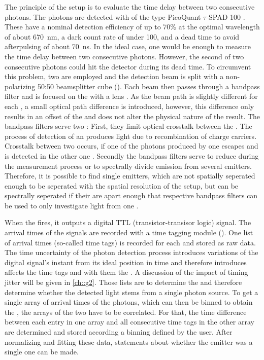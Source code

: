 		The principle of the \hbt setup is to evaluate the time delay between two consecutive photons. 
		The photons are detected with \apds of the type PicoQuant $\tau${}-SPAD 100 .
		These \apds have a nominal detection efficiency of up to 70\% at the optimal wavelength of about \SI{670}{\nm}, a dark count rate of under \SI{100}{\cps}, and a dead time to avoid afterpulsing of about \SI{70}{\ns}.
		In the ideal case, one \APD would be enough to measure the time delay between two consecutive photons. 
		However, the second of two consecutive photons could hit the detector during its dead time.
		To circumvent this problem, two \APDs are employed and the detection beam is split with a non-polarizing 50:50 beamsplitter cube ().
		Each beam then passes through a bandpass filter and is focused on the \apd with a lens .
		As the beam path is slightly different for each \APD, a small optical path difference is introduced, however, this difference only results in an offset of the \gtf and does not alter the physical nature of the result.
		The bandpass filters serve two :
		First, they limit optical crosstalk between the \apds. 
		The process of detection of an \apd produces light due to recombination of charge carriers. 
		Crosstalk between two \apds occurs, if one of the photons produced by one \apd escapes and is detected in the other one \cite{Younger2009}.  
		Secondly the bandpass filters serve to reduce \bkg during the \gt measurement process or to spectrally divide emission from several emitters.
		Therefore, it is possible to find single emitters, which are not spatially seperated enough to be seperated with the spatial resolution of the setup, but can be spectrally seperated if their \ZPLs are apart enough that respective bandpass filters can be used to only investigate light from one \ZPL.

		When the \APD fires, it outputs a digital TTL (transistor-transisor logic) signal. 
		The arrival times of the signals are recorded with a time tagging module ().
		One list of arrival times (so-called time tags) is recorded for each \APD and stored as raw data.
		The time uncertainty of the photon detection process introduces variations of the digital signal's instant from its ideal position in time and therefore introduces affects the time tags and with them the \gtf.
		A discussion of the impact of timing jitter will be given in \autoref{ch::g2}. 
		Those lists are to determine the \gtf and therefore determine whether the detected light stems from a single photon source.
		To get a single array of arrival times of the photons, which can then be binned to obtain the \gtf, the arrays of the two \APDs have to be correlated.
		For that, the time difference between each entry in one array and all consecutive time tags in the other array are determined and stored according a binning defined by the user.
		After normalizing and fitting these data, statements about whether the emitter was a single one can be made.





